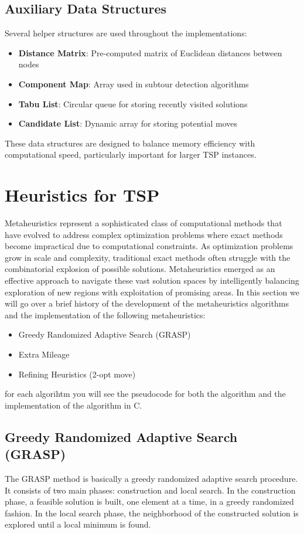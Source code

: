 \documentclass{article}
\begin{document}
\subsection{Auxiliary Data Structures}
Several helper structures are used throughout the implementations:

\begin{itemize}
	\item \textbf{Distance Matrix}: Pre-computed matrix of Euclidean distances between nodes
	\item \textbf{Component Map}: Array used in subtour detection algorithms
	\item \textbf{Tabu List}: Circular queue for storing recently visited solutions
	\item \textbf{Candidate List}: Dynamic array for storing potential moves
\end{itemize}

These data structures are designed to balance memory efficiency with computational speed, particularly important for larger TSP instances.


\newpage

\section{Heuristics for TSP}
Metaheuristics represent a sophisticated class of computational methods that have evolved to address complex optimization problems where exact methods become impractical due to computational constraints. 
As optimization problems grow in scale and complexity, traditional exact methods often struggle with the combinatorial explosion of possible solutions. 
Metaheuristics emerged as an effective approach to navigate these vast solution spaces by intelligently balancing exploration of new regions with exploitation of promising areas.
In this section we will go over a brief history of the development of the metaheuristics algorithms and the implementation of the following metaheuristics:
\begin{itemize}
	\item Greedy Randomized Adaptive Search (GRASP)
	\item Extra Mileage
	\item Refining Heuristics (2-opt move)
\end{itemize}
for each algorihtm you will see the pseudocode for both the algorithm and the implementation of the algorithm in C.


\subsection{Greedy Randomized Adaptive Search (GRASP)}
The GRASP method is basically a greedy randomized adaptive search procedure.
It consists of two main phases: construction and local search.
In the construction phase, a feasible solution is built, one element at a time, in a greedy randomized fashion.
In the local search phase, the neighborhood of the constructed solution is explored until a local minimum is found.
\end{document}
